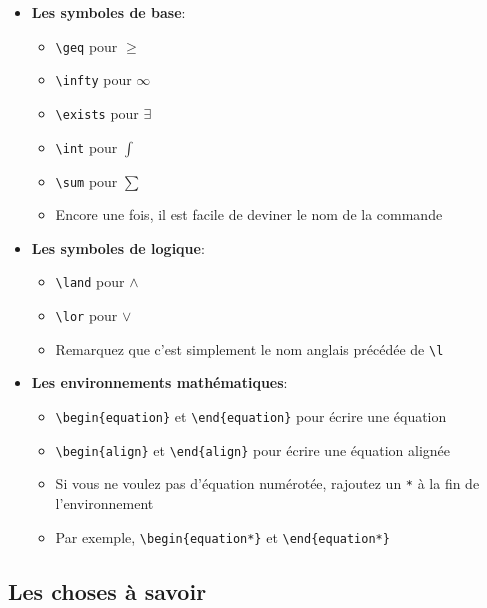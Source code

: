 \begin{itemize}
    \item \textbf{Les symboles de base}:
    \begin{itemize}
        \item \texttt{\textbackslash{}geq} pour \(\geq\)
        \item \texttt{\textbackslash{}infty} pour \(\infty\)
        \item \texttt{\textbackslash{}exists} pour \(\exists\)
        \item \texttt{\textbackslash{}int} pour \(\int\)
        \item \texttt{\textbackslash{}sum} pour \(\sum\)
        \item Encore une fois, il est facile de deviner le nom de la commande
    \end{itemize}
    \item \textbf{Les symboles de logique}:
    \begin{itemize}
        \item \texttt{\textbackslash{}land} pour \(\land\)
        \item \texttt{\textbackslash{}lor} pour \(\lor\)
        \item Remarquez que c'est simplement le nom anglais précédée de \texttt{\textbackslash{}l}
    \end{itemize}
    \item \textbf{Les environnements mathématiques}:
    \begin{itemize}
        \item \texttt{\textbackslash{}begin\{equation\}} et \texttt{\textbackslash{}end\{equation\}} pour écrire une équation
        \item \texttt{\textbackslash{}begin\{align\}} et \texttt{\textbackslash{}end\{align\}} pour écrire une équation alignée
        \item Si vous ne voulez pas d'équation numérotée, rajoutez un \texttt{*} à la fin de l'environnement
        \item Par exemple, \texttt{\textbackslash{}begin\{equation*\}} et \texttt{\textbackslash{}end\{equation*\}}
    \end{itemize}
\end{itemize}

\subsection{Les choses à savoir}\label{subsec:latex_math_know}

